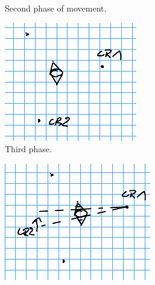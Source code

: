 \begin{figure}[h!]
\begin{subfigure}[t]{0.3\linewidth}
		\caption{Second phase of movement.}
		\label{fig:triangle_4}
	\end{subfigure}
	\hfill
	\begin{subfigure}[t]{0.3\linewidth}
		\centering
		\includegraphics[width=\linewidth]{graphics/triangle_5.png}
		\caption{Third phase.}
		\label{fig:triangle_5}
	\end{subfigure}
	\hfill
	\begin{subfigure}[t]{0.3\linewidth}
		\centering
		\includegraphics[width=\linewidth]{graphics/triangle_6.png}

\end{subfigure}
\end{figure}
